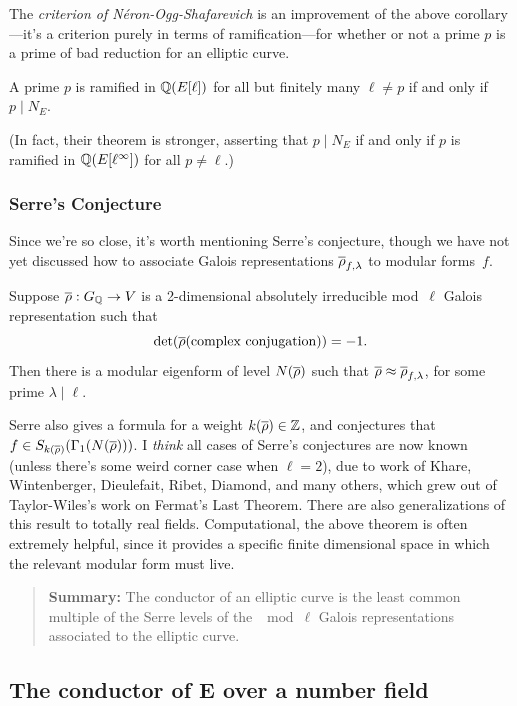 \documentclass{book}
\begin{document}
The {\em criterion of N\'eron-Ogg-Shafarevich} is an improvement
of the above corollary---it's a criterion purely
in terms of ramification---for whether or not a prime
$p$ is a prime of bad reduction for an elliptic curve.
\begin{theorem}
A prime $p$ is ramified in $\mathbb{Q}(E[\ell])$ for all but
finitely many $\ell\neq p$ if and only if $p\mid N_E$.
\end{theorem}
(In fact, their theorem is stronger, asserting that $p\mid N_E$
if and only if $p$ is ramified in $\mathbb{Q}(E[\ell^\infty])$ for
all $p\neq \ell$.)


\subsubsection{Serre's Conjecture}
Since we're so close, it's worth mentioning Serre's conjecture,
though we have not yet discussed how to
associate Galois representations $\overline{\rho}_{f,\lambda}$
to modular forms~$f$.
\begin{theorem}
Suppose $\overline{\rho}:G_{\mathbb{Q}}\to V$
is a 2-dimensional absolutely irreducible
mod~$\ell$ Galois representation such that
$$\det(\overline{\rho}(\text{\rm complex conjugation})) =-1.$$
Then there is a modular eigenform of level
$N(\overline{\rho})$ such that $\overline{\rho} \approx \overline{\rho}_{f,\lambda}$,
for some prime $\lambda\mid \ell$.
\end{theorem}
Serre also gives a formula for a weight $k(\overline{\rho})\in\mathbb{Z}$, and
conjectures that $f\in S_{k(\overline{\rho})}(\Gamma_1(N(\overline{\rho})))$.
I {\em think} all cases of Serre's conjectures are now known
(unless there's some weird corner case when $\ell=2$), due to
work of Khare, Wintenberger, Dieulefait, Ribet, Diamond, and many
others, which grew out of Taylor-Wiles's work on Fermat's Last Theorem.
There are also generalizations of this result to totally real
fields.  Computational, the above theorem is often extremely
helpful, since it provides a specific finite dimensional space
in which the relevant modular form must live.


\begin{quote}
{\bf Summary:} The conductor of an elliptic curve is the least common multiple
of the Serre levels of the $\mod\ell$ Galois representations associated to the
elliptic curve.
\end{quote}

\subsection{The conductor of E over a number field}
\end{document}
